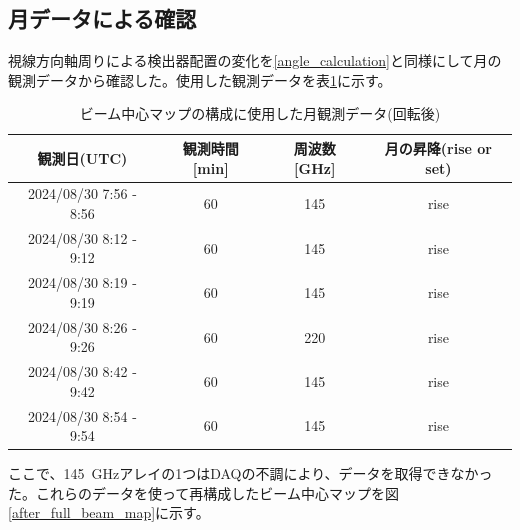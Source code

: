 \subsection{月データによる確認}
\label{moon_ana}
視線方向軸周りによる検出器配置の変化を\ref{angle_calculation}と同様にして月の観測データから確認した。使用した観測データを表\ref{after_full_array_table}に示す。
\begin{table}[htbp]
  \centering
  \caption{ビーム中心マップの構成に使用した月観測データ(回転後)}
  \vspace{3mm}
  \begin{tabular}{cccc} \hline\hline
    観測日(UTC) & 観測時間 [min] & 周波数 [GHz] & 月の昇降(rise or set) \\ \hline
    2024/08/30 7:56 - 8:56 & 60 & 145 & rise \\
    2024/08/30 8:12 - 9:12 & 60 & 145 & rise \\
    2024/08/30 8:19 - 9:19 & 60 & 145 & rise \\
    2024/08/30 8:26 - 9:26 & 60 & 220 & rise \\
    2024/08/30 8:42 - 9:42 & 60 & 145 & rise \\
    2024/08/30 8:54 - 9:54 & 60 & 145 & rise \\ \hline\hline

  \end{tabular}
  \label{after_full_array_table}
\end{table}
ここで、\SI{145}{GHz}アレイの1つはDAQの不調により、データを取得できなかった。これらのデータを使って再構成したビーム中心マップを図\ref{after_full_beam_map}に示す。

